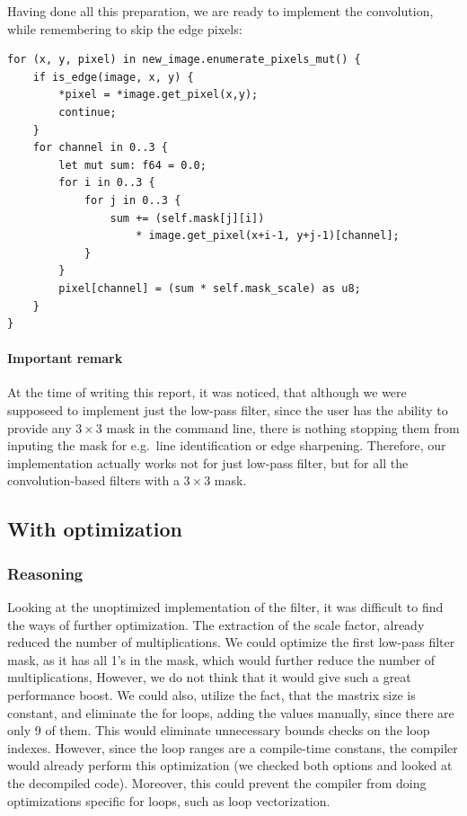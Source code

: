 \documentclass[12pt]{article}
\begin{document}
Having done all this preparation, we are ready to implement the convolution, while remembering to skip the edge pixels:

\pagebreak[3]
\begin{lstlisting}
for (x, y, pixel) in new_image.enumerate_pixels_mut() {
    if is_edge(image, x, y) {
        *pixel = *image.get_pixel(x,y);
        continue;
    }
    for channel in 0..3 {
        let mut sum: f64 = 0.0;
        for i in 0..3 {
            for j in 0..3 {
                sum += (self.mask[j][i])
                    * image.get_pixel(x+i-1, y+j-1)[channel];
            }
        }
        pixel[channel] = (sum * self.mask_scale) as u8;
    }
}
\end{lstlisting}

\paragraph{Important remark}
At the time of writing this report, it was noticed, that although we were supposeed to implement just the low-pass filter,
since the user has the ability to provide any $3\times3$ mask in the command line,
there is nothing stopping them from inputing the mask for e.g.\ line identification or edge sharpening.
Therefore, our implementation actually works not for just low-pass filter, but for all the convolution-based filters with a $3\times3$ mask.

\subsection{With optimization}

\subsubsection{Reasoning}

Looking at the unoptimized implementation of the filter, it was difficult to find the ways of further optimization.
The extraction of the scale factor, already reduced the number of multiplications.
We could optimize the first low-pass filter mask, as it has all 1's in the mask, which would further reduce the number of multiplications,
However, we do not think that it would give such a great performance boost.
We could also, utilize the fact, that the mastrix size is constant, and eliminate the for loops, adding the values manually, since there are only 9 of them.
This would eliminate unnecessary bounds checks on the loop indexes.
However, since the loop ranges are a compile-time constans, the compiler would already perform this optimization (we checked both options and looked at the decompiled code).
Moreover, this could prevent the compiler from doing optimizations specific for loops, such as loop vectorization.
\end{document}

